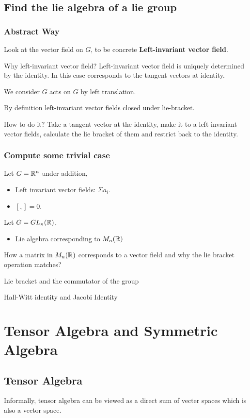\documentclass[11pt]{article}
\begin{document}
\subsection{Find the lie algebra of a lie group}
\label{sec:orgabb898e}
\subsubsection{Abstract Way}
\label{sec:org933da86}
Look at the vector field on \(G\), to be concrete \textbf{Left-invariant vector field}.

Why left-invariant vector field?
Left-invariant vector field is uniquely determined by the identity. In this case corresponds to the tangent vectors at identity.

We consider \(G\) acts on \(G\) by left translation.

By definition left-invariant vector fields closed under lie-bracket.

How to do it?
Take a tangent vector at the identity, make it to a left-invariant vector fields, calculate the lie bracket of them and restrict back to the identity.
\subsubsection{Compute some trivial case}
\label{sec:orgac0d2c9}
Let \(G = \mathbb{R}^n\) under addition,
\begin{itemize}
\item Left invariant vector fields: \(\Sigma a_i\).
\item \([,] = 0\).
\end{itemize}

Let \(G = GL_n(\mathbb{R})\),
\begin{itemize}
\item Lie algebra corresponding to \(M_n(\mathbb{R})\)
\end{itemize}

How a matrix in \(M_n(\mathbb{R})\) corresponds to a vector field and why the lie bracket operation matches?

Lie bracket and the commutator of the group

Hall-Witt identity and Jacobi Identity
\section{Tensor Algebra and Symmetric Algebra}
\label{sec:org0c25354}
\subsection{Tensor Algebra}
\label{sec:org08638d5}
\begin{definition}
Informally, tensor algebra can be viewed as a direct sum of vecter spaces which is also a vector space.
\end{definition}
\end{document}
